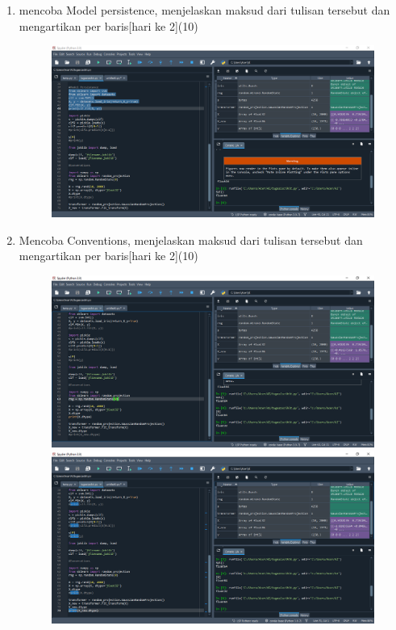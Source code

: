 \begin{enumerate}
\begin{figure}[!htbp]
	\end{figure}
\newpage
\item
mencoba Model persistence, menjelaskan maksud dari tulisan tersebut dan mengartikan per baris[hari ke 2](10)
\begin{figure}[!htbp]
		\centering
		\includegraphics[scale=0.4]{figures/4.PNG}
	
	\end{figure}
\newpage
\item 
Mencoba Conventions, menjelaskan maksud dari tulisan tersebut dan mengartikan per baris[hari ke 2](10)
\begin{figure}[!htbp]
		\centering
		\includegraphics[scale=0.4]{figures/5.PNG}
		\includegraphics[scale=0.5]{figures/6.PNG}
	\end{figure}
\newpage
\end{enumerate}


